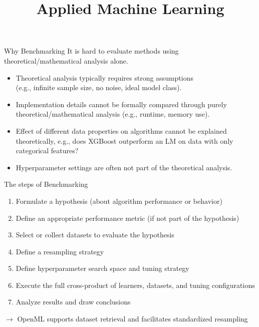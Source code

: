 \documentclass[11pt,compress,t,notes=noshow, aspectratio=169, xcolor=table]{beamer}
\title{Applied Machine Learning}
\date{}
\begin{document}
\newcommand{\titlefigure}{figure/OpenML.png}
\newcommand{\learninggoals}{
\item Why Benchmarking?
\item What is OpenML?}


\begin{vbframe}{Why Benchmarking}
\vfill
It is hard to evaluate methods using theoretical/mathematical analysis alone.
\vfill
\begin{itemize}
    \item Theoretical analysis typically requires strong assumptions \\
    (e.g., infinite sample size, no noise, ideal model class).
    \item Implementation details cannot be formally compared through purely theoretical/mathematical analysis (e.g., runtime, memory use).
    \item Effect of different data properties on algorithms cannot be explained theoretically, e.g., does XGBoost outperform an LM on data with only categorical features?
    \item Hyperparameter settings are often not part of the theoretical analysis.
\end{itemize}
\vfill
\end{vbframe}

\begin{vbframe}{The steps of Benchmarking}
\vfill
\begin{enumerate}
    \item Formulate a hypothesis (about algorithm performance or behavior)
    \item Define an appropriate performance metric (if not part of the hypothesis)
    \item Select or collect datasets to evaluate the hypothesis
    \item Define a resampling strategy
    \item Define hyperparameter search space and tuning strategy
    \item Execute the full cross-product of learners, datasets, and tuning configurations
    \item Analyze results and draw conclusions
\end{enumerate}
\vfill
\pause
$\rightarrow$ OpenML supports dataset retrieval and facilitates standardized resampling
\end{vbframe}
\end{document}

